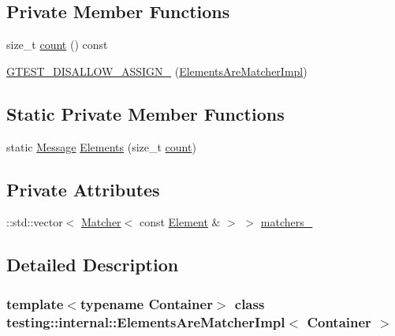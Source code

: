 \subsection*{Private Member Functions}
\begin{DoxyCompactItemize}
\item 
size\+\_\+t \hyperlink{classtesting_1_1internal_1_1ElementsAreMatcherImpl_a8a8cf605a9fdc0eb8855fe9ce1aafb1e}{count} () const
\item 
\hyperlink{classtesting_1_1internal_1_1ElementsAreMatcherImpl_ab77985a10f91fe7cbf1a30883e23cb06}{G\+T\+E\+S\+T\+\_\+\+D\+I\+S\+A\+L\+L\+O\+W\+\_\+\+A\+S\+S\+I\+G\+N\+\_\+} (\hyperlink{classtesting_1_1internal_1_1ElementsAreMatcherImpl}{Elements\+Are\+Matcher\+Impl})
\end{DoxyCompactItemize}
\subsection*{Static Private Member Functions}
\begin{DoxyCompactItemize}
\item 
static \hyperlink{classtesting_1_1Message}{Message} \hyperlink{classtesting_1_1internal_1_1ElementsAreMatcherImpl_a93f460d160390f2984c040e1869d3b0d}{Elements} (size\+\_\+t \hyperlink{classtesting_1_1internal_1_1ElementsAreMatcherImpl_a8a8cf605a9fdc0eb8855fe9ce1aafb1e}{count})
\end{DoxyCompactItemize}
\subsection*{Private Attributes}
\begin{DoxyCompactItemize}
\item 
\+::std\+::vector$<$ \hyperlink{classtesting_1_1Matcher}{Matcher}$<$ const \hyperlink{classtesting_1_1internal_1_1ElementsAreMatcherImpl_ab2ae88256ac950b69cd2af67b9820c87}{Element} \& $>$ $>$ \hyperlink{classtesting_1_1internal_1_1ElementsAreMatcherImpl_aefcf41a7cfe74274c68272a67fb94e9f}{matchers\+\_\+}
\end{DoxyCompactItemize}


\subsection{Detailed Description}
\subsubsection*{template$<$typename Container$>$\newline
class testing\+::internal\+::\+Elements\+Are\+Matcher\+Impl$<$ Container $>$}



